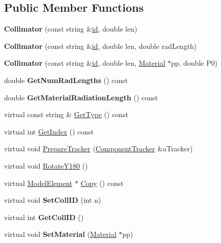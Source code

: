\subsection*{Public Member Functions}
\begin{DoxyCompactItemize}
\item 
\mbox{\label{classCollimator_ab48a84c675c70f019d22135d487c2196}} 
{\bfseries Collimator} (const string \&\hyperlink{classModelElement_aada171ead2085c75b592cf07d91bc5c2}{id}, double len)
\item 
\mbox{\label{classCollimator_ad2ccfcac873485325e5d3ab81d6074bc}} 
{\bfseries Collimator} (const string \&\hyperlink{classModelElement_aada171ead2085c75b592cf07d91bc5c2}{id}, double len, double rad\+Length)
\item 
\mbox{\label{classCollimator_a62fb8545803efcdfe2ec6e4148efe56b}} 
{\bfseries Collimator} (const string \&\hyperlink{classModelElement_aada171ead2085c75b592cf07d91bc5c2}{id}, double len, \hyperlink{classMaterial}{Material} $\ast$pp, double P0)
\item 
\mbox{\label{classCollimator_a5ee805434a47d85f881fd34bf659c4c5}} 
double {\bfseries Get\+Num\+Rad\+Lengths} () const
\item 
\mbox{\label{classCollimator_a7e3d4a833345b797ab162809cc8317bd}} 
double {\bfseries Get\+Material\+Radiation\+Length} () const
\item 
virtual const string \& \hyperlink{classCollimator_aab811743031565147b965ca9b9fdfbc4}{Get\+Type} () const
\item 
virtual int \hyperlink{classCollimator_a158a9d8999d55a27efe4e56e5af8b56a}{Get\+Index} () const
\item 
virtual void \hyperlink{classCollimator_acbcf691bfcf53d652d14b9381c711fe7}{Prepare\+Tracker} (\hyperlink{classComponentTracker}{Component\+Tracker} \&a\+Tracker)
\item 
virtual void \hyperlink{classCollimator_a89d782779f8e57af28eeb963078bbf20}{Rotate\+Y180} ()
\item 
virtual \hyperlink{classModelElement}{Model\+Element} $\ast$ \hyperlink{classCollimator_a82e63d47e1688d84f2e8f2fc3d247700}{Copy} () const
\item 
\mbox{\label{classCollimator_af3b0682b5f87377f653370e38d831edb}} 
virtual void {\bfseries Set\+Coll\+ID} (int n)
\item 
\mbox{\label{classCollimator_a7efb007cd0aa46b4e15260a983eb3fd4}} 
virtual int {\bfseries Get\+Coll\+ID} ()
\item 
\mbox{\label{classCollimator_a023abea4e74906fd0e2b6d74a7d679b6}} 
virtual void {\bfseries Set\+Material} (\hyperlink{classMaterial}{Material} $\ast$pp)
\end{DoxyCompactItemize}
